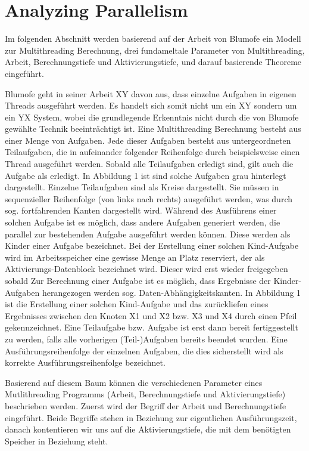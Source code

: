 \section{Analyzing Parallelism}

Im folgenden Abschnitt werden basierend auf der Arbeit von Blumofe ein Modell zur Multithreading Berechnung, drei fundameltale Parameter von Multithreading, Arbeit, Berechnungstiefe und Aktivierungstiefe, und darauf basierende Theoreme eingeführt.

Blumofe geht in seiner Arbeit XY davon aus, dass einzelne Aufgaben in eigenen Threads ausgeführt werden. Es handelt sich somit nicht um ein XY sondern um ein YX System, wobei die grundlegende Erkenntnis nicht durch die von Blumofe gewählte Technik beeinträchtigt ist.
Eine Multithreading Berechnung besteht aus einer Menge von Aufgaben. Jede dieser Aufgaben besteht aus untergeordneten Teilaufgaben, die in aufeinander folgender Reihenfolge durch beispielsweise einen Thread ausgeführt werden. Sobald alle Teilaufgaben erledigt sind, gilt auch die Aufgabe als erledigt. In Abbildung 1 ist sind solche Aufgaben grau hinterlegt dargestellt. Einzelne Teilaufgaben sind als Kreise dargestellt. Sie müssen in sequenzieller Reihenfolge (von links nach rechts) ausgeführt werden, was durch sog. fortfahrenden Kanten dargestellt wird.
Während des Ausführens einer solchen Aufgabe ist es möglich, dass andere Aufgaben generiert werden, die parallel zur bestehenden Aufgabe ausgeführt werden können. Diese werden als Kinder einer Aufgabe bezeichnet. Bei der Erstellung einer solchen Kind-Aufgabe wird im Arbeitsspeicher eine gewisse Menge an Platz reserviert, der als Aktivierungs-Datenblock bezeichnet wird. Dieser wird erst wieder freigegeben sobald Zur Berechnung einer Aufgabe ist es möglich, dass Ergebnisse der Kinder-Aufgaben herangezogen werden sog. Daten-Abhängigkeitskanten. In Abbildung 1 ist die Erstellung einer solchen Kind-Aufgabe und das zurückliefen eines Ergebnisses zwischen den Knoten X1 und X2 bzw. X3 und X4 durch einen Pfeil gekennzeichnet.
Eine Teilaufgabe bzw. Aufgabe ist erst dann bereit fertiggestellt zu werden, falls alle vorherigen (Teil-)Aufgaben bereits beendet wurden. Eine Ausführungsreihenfolge der einzelnen Aufgaben, die dies sicherstellt wird als korrekte Ausführungsreihenfolge bezeichnet. 

Basierend auf diesem Baum können die verschiedenen Parameter eines Mutlithreading Programms (Arbeit, Berechnungstiefe und Aktivierungstiefe) beschrieben werden. Zuerst wird der Begriff der Arbeit und Berechnungstiefe eingeführt. Beide Begriffe stehen in Beziehung zur eigentlichen Ausführungszeit, danach kontentieren wir uns auf die Aktivierungstiefe, die mit dem benötigten Speicher in Beziehung steht.

